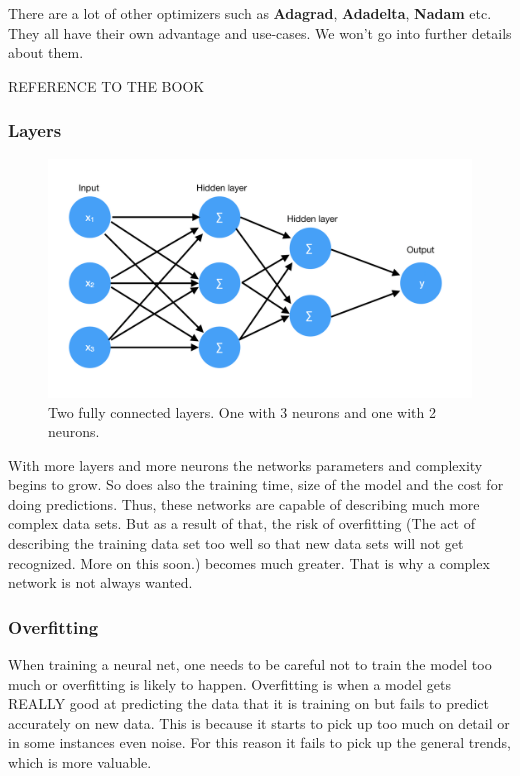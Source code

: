 There are a lot of other optimizers such as \textbf{Adagrad}, \textbf{Adadelta}, \textbf{Nadam} etc. They all have their own advantage and use-cases. We won't go into further details about them.

REFERENCE TO THE BOOK

\subsubsection{Layers}

\begin{figure}[hbtp]
\begin{center}
\includegraphics[width = 1.0\textwidth]{./Images/fully_connected.jpg} 
\caption{Two fully connected layers. One with 3 neurons and one with 2 neurons.}
\end{center}
\end{figure}

With more layers and more neurons the networks parameters and complexity begins to grow. So does also the training time, size of the model and the cost for doing predictions. Thus, these networks are capable of describing much more complex data sets. But as a result of that, the risk of overfitting (The act of describing the training data set too well so that new data sets will not get recognized. More on this soon.) becomes much greater. That is why a complex network is not always wanted.

\subsubsection{Overfitting}
When training a neural net, one needs to be careful not to train the model too much or overfitting is likely to happen. Overfitting is when a model gets REALLY good at predicting the data that it is training on but fails to predict accurately on new data. This is because it starts to pick up too much on detail or in some instances even noise. For this reason it fails to pick up the general trends, which is more valuable. 


